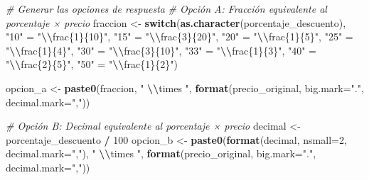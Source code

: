 \documentclass[
]{article}
\newenvironment{Shaded}{\begin{snugshade}}{\end{snugshade}}
\newcommand{\AttributeTok}[1]{\textcolor[rgb]{0.13,0.29,0.53}{#1}}
\newcommand{\CommentTok}[1]{\textcolor[rgb]{0.56,0.35,0.01}{\textit{#1}}}
\newcommand{\ControlFlowTok}[1]{\textcolor[rgb]{0.13,0.29,0.53}{\textbf{#1}}}
\newcommand{\DecValTok}[1]{\textcolor[rgb]{0.00,0.00,0.81}{#1}}
\newcommand{\FunctionTok}[1]{\textcolor[rgb]{0.13,0.29,0.53}{\textbf{#1}}}
\newcommand{\NormalTok}[1]{#1}
\newcommand{\OtherTok}[1]{\textcolor[rgb]{0.56,0.35,0.01}{#1}}
\newcommand{\SpecialCharTok}[1]{\textcolor[rgb]{0.81,0.36,0.00}{\textbf{#1}}}
\newcommand{\StringTok}[1]{\textcolor[rgb]{0.31,0.60,0.02}{#1}}
\begin{document}
\begin{Shaded}
\begin{Highlighting}[]
\CommentTok{\# Generar las opciones de respuesta}
\CommentTok{\# Opción A: Fracción equivalente al porcentaje × precio}
\NormalTok{fraccion }\OtherTok{\textless{}{-}} \ControlFlowTok{switch}\NormalTok{(}\FunctionTok{as.character}\NormalTok{(porcentaje\_descuento),}
                  \StringTok{"10"} \OtherTok{=} \StringTok{"}\SpecialCharTok{\textbackslash{}\textbackslash{}}\StringTok{frac\{1\}\{10\}"}\NormalTok{,}
                  \StringTok{"15"} \OtherTok{=} \StringTok{"}\SpecialCharTok{\textbackslash{}\textbackslash{}}\StringTok{frac\{3\}\{20\}"}\NormalTok{,}
                  \StringTok{"20"} \OtherTok{=} \StringTok{"}\SpecialCharTok{\textbackslash{}\textbackslash{}}\StringTok{frac\{1\}\{5\}"}\NormalTok{,}
                  \StringTok{"25"} \OtherTok{=} \StringTok{"}\SpecialCharTok{\textbackslash{}\textbackslash{}}\StringTok{frac\{1\}\{4\}"}\NormalTok{,}
                  \StringTok{"30"} \OtherTok{=} \StringTok{"}\SpecialCharTok{\textbackslash{}\textbackslash{}}\StringTok{frac\{3\}\{10\}"}\NormalTok{,}
                  \StringTok{"33"} \OtherTok{=} \StringTok{"}\SpecialCharTok{\textbackslash{}\textbackslash{}}\StringTok{frac\{1\}\{3\}"}\NormalTok{,}
                  \StringTok{"40"} \OtherTok{=} \StringTok{"}\SpecialCharTok{\textbackslash{}\textbackslash{}}\StringTok{frac\{2\}\{5\}"}\NormalTok{,}
                  \StringTok{"50"} \OtherTok{=} \StringTok{"}\SpecialCharTok{\textbackslash{}\textbackslash{}}\StringTok{frac\{1\}\{2\}"}\NormalTok{)}

\NormalTok{opcion\_a }\OtherTok{\textless{}{-}} \FunctionTok{paste0}\NormalTok{(fraccion, }\StringTok{" }\SpecialCharTok{\textbackslash{}\textbackslash{}}\StringTok{times "}\NormalTok{, }\FunctionTok{format}\NormalTok{(precio\_original, }\AttributeTok{big.mark=}\StringTok{"."}\NormalTok{, }\AttributeTok{decimal.mark=}\StringTok{","}\NormalTok{))}

\CommentTok{\# Opción B: Decimal equivalente al porcentaje × precio}
\NormalTok{decimal }\OtherTok{\textless{}{-}}\NormalTok{ porcentaje\_descuento }\SpecialCharTok{/} \DecValTok{100}
\NormalTok{opcion\_b }\OtherTok{\textless{}{-}} \FunctionTok{paste0}\NormalTok{(}\FunctionTok{format}\NormalTok{(decimal, }\AttributeTok{nsmall=}\DecValTok{2}\NormalTok{, }\AttributeTok{decimal.mark=}\StringTok{","}\NormalTok{), }\StringTok{" }\SpecialCharTok{\textbackslash{}\textbackslash{}}\StringTok{times "}\NormalTok{, }\FunctionTok{format}\NormalTok{(precio\_original, }\AttributeTok{big.mark=}\StringTok{"."}\NormalTok{, }\AttributeTok{decimal.mark=}\StringTok{","}\NormalTok{))}


\end{Highlighting}
\end{Shaded}
\end{document}
